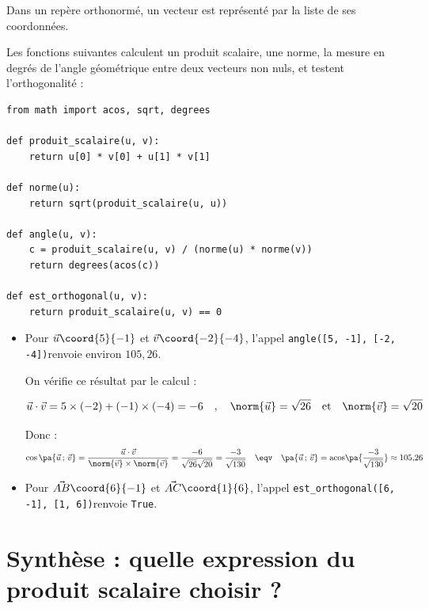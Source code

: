 \begin{ex}
	Dans un repère orthonormé, un vecteur est représenté par la liste de ses coordonnées.

	Les fonctions suivantes calculent un produit scalaire, une norme, la mesure en degrés de l'angle géométrique entre deux vecteurs non nuls, et testent l'orthogonalité :

	\begin{lstlisting}
from math import acos, sqrt, degrees

def produit_scalaire(u, v):
    return u[0] * v[0] + u[1] * v[1]

def norme(u):
    return sqrt(produit_scalaire(u, u))

def angle(u, v):
    c = produit_scalaire(u, v) / (norme(u) * norme(v))
    return degrees(acos(c))

def est_orthogonal(u, v):
    return produit_scalaire(u, v) == 0
\end{lstlisting}

	\begin{itemize}
		\item Pour $\vec{u}\coord{5}{-1}$ et $\vec{v}\coord{-2}{-4}$, l'appel \quad\texttt{angle([5, -1], [-2, -4])}\quad renvoie environ $105{,}26$.

		      On vérifie ce résultat par le calcul :

		      \[
			      \vec{u} \cdot \vec{v} = 5 \times (-2) + (-1) \times (-4) = -6\quad,\quad\norm{\vec{u}} = \sqrt{26}\quad\text{et}\quad\norm{\vec{v}} = \sqrt{20}
		      \]

		      Donc :
		      \[
			      \cos\pa{\vec{u}\,;\,\vec{v}} = \dfrac{\vec{u}\cdot\vec{v}}{\norm{\vec{v}}\times\norm{\vec{v}}} = \dfrac{-6}{\sqrt{26}\sqrt{20}} = \dfrac{-3}{\sqrt{130}}\quad\eqv\quad \pa{\vec{u}\,;\,\vec{v}}=\text{acos}\pa{\dfrac{-3}{\sqrt{130}}}\approx 105{,}26
		      \]

		\item Pour $\vec{AB}\coord{6}{-1}$ et $\vec{AC}\coord{1}{6}$, l'appel \quad\texttt{est\_orthogonal([6, -1], [1, 6])}\quad renvoie \quad\texttt{True}.
	\end{itemize}
\end{ex}

\section{Synthèse : quelle expression du produit scalaire choisir ?}

